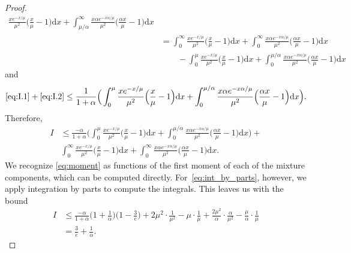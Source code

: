 \documentclass[runningheads]{llncs}
\newcommand{\diff}{\mathrm{d}}
\begin{document}
\begin{subappendices}
\begin{proof}
\begin{align*}
        \frac{x e^{-x/\mu}}{\mu^2}\Big( \frac{x}{\mu} - 1\Big) \diff x
        + \int_{\mu / \alpha}^\infty \frac{x \alpha e^{-x \alpha /\mu}}{\mu^2}\Big( \frac{\alpha x}{\mu} - 1\Big) \diff x
      \\ &
           =\int_0^\infty \frac{x e^{-x/\mu}}{\mu^2}\Big( \frac{x}{\mu} - 1\Big) \diff x
           + \int_0^\infty \frac{x \alpha e^{-x \alpha /\mu}}{\mu^2}\Big( \frac{\alpha x}{\mu} - 1\Big) \diff x
      \\
      &\qquad
        - \int_0^\mu\frac{x e^{-x/\mu}}{\mu^2}\Big( \frac{x}{\mu} - 1\Big) \diff x
        + \int_0^{\mu /\alpha} \frac{x \alpha e^{-x \alpha /\mu}}{\mu^2}\Big( \frac{\alpha x}{\mu} - 1\Big) \diff x
    \end{align*}
    and
    \begin{align*}
      \eqref{eq:I.1} + \eqref{eq:I.2}
      \leq \frac{1}{1+\alpha} \Big(
      \int_0^\mu\frac{x e^{-x/\mu}}{\mu^2}\Big( \frac{x}{\mu} - 1\Big)\diff x
      +  \int_0^{\mu / \alpha} \frac{x \alpha e^{-x \alpha /\mu}}{\mu^2}\Big( \frac{\alpha x}{\mu} - 1\Big) \diff x \Big).
    \end{align*}
    Therefore,
    \begin{align}
        I& \leq
           \frac{-\alpha}{1+\alpha}
           \Big(
           \int_0^\mu\frac{x e^{-x/\mu}}{\mu^2}\Big( \frac{x}{\mu} - 1\Big)\diff x
           +  \int_0^{\mu / \alpha} \frac{x \alpha e^{-x \alpha /\mu}}{\mu^2}\Big( \frac{\alpha x}{\mu} - 1\Big) \diff x
           \Big)
           + \label{eq:int_by_parts}
      \\ &
           \int_0^\infty\frac{x e^{-x/\mu}}{\mu^2}\Big( \frac{x}{\mu} - 1\Big) \diff x
           +
           \int_0^\infty \frac{x \alpha e^{-x \alpha /\mu}}{\mu^2}\Big( \frac{\alpha x}{\mu} - 1\Big) \diff x.
           \label{eq:moment}
    \end{align}
    We recognize \eqref{eq:moment} as functions of the first moment of each of the
    mixture components, which can be computed directly.
    For~\eqref{eq:int_by_parts}, however, we apply integration by parts to
    compute the integrals.
    This leaves us with the bound
    \begin{align*}
      I
      & \leq
        \frac{-\alpha}{1+\alpha}\Big(1+\frac{1}{\alpha}\Big) \Big( 1- \frac{3}{e}\Big)
        + 2\mu^2\cdot\frac{1}{\mu^2} - \mu\cdot \frac{1}{\mu}
        + \frac{2\mu^2}{\alpha}\cdot\frac{\alpha}{\mu^2}-\frac{\mu}{\alpha}\cdot \frac{1}{\mu}
      \\
      &= \frac{3}{e}+\frac{1}{\alpha}.
    \end{align*}

\end{proof}
\end{subappendices}
\end{document}
